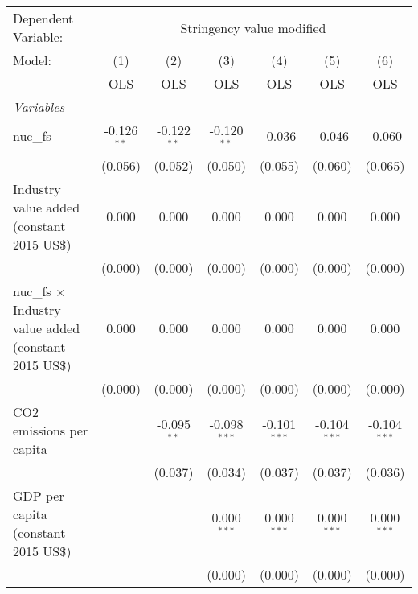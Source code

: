 
\begingroup
\centering
\begin{tabular}{lcccccc}
   \toprule
   Dependent Variable: & \multicolumn{6}{c}{Stringency value modified}\\
   Model:                                                        & (1)           & (2)           & (3)            & (4)            & (5)            & (6)\\  
                                                                 &  OLS          & OLS           & OLS            & OLS            & OLS            & OLS\\  
   \midrule
   \emph{Variables}\\
   nuc\_fs                                                       & -0.126$^{**}$ & -0.122$^{**}$ & -0.120$^{**}$  & -0.036         & -0.046         & -0.060\\   
                                                                 & (0.056)       & (0.052)       & (0.050)        & (0.055)        & (0.060)        & (0.065)\\   
   Industry value added (constant 2015 US\$)                     & 0.000         & 0.000         & 0.000          & 0.000          & 0.000          & 0.000\\   
                                                                 & (0.000)       & (0.000)       & (0.000)        & (0.000)        & (0.000)        & (0.000)\\   
   nuc\_fs $\times$ Industry value added (constant 2015 US\$)    & 0.000         & 0.000         & 0.000          & 0.000          & 0.000          & 0.000\\   
                                                                 & (0.000)       & (0.000)       & (0.000)        & (0.000)        & (0.000)        & (0.000)\\   
   CO2 emissions per capita                                      &               & -0.095$^{**}$ & -0.098$^{***}$ & -0.101$^{***}$ & -0.104$^{***}$ & -0.104$^{***}$\\   
                                                                 &               & (0.037)       & (0.034)        & (0.037)        & (0.037)        & (0.036)\\   
   GDP per capita (constant 2015 US\$)                           &               &               & 0.000$^{***}$  & 0.000$^{***}$  & 0.000$^{***}$  & 0.000$^{***}$\\   
                                                                 &               &               & (0.000)        & (0.000)        & (0.000)        & (0.000)\\   

\end{tabular}
